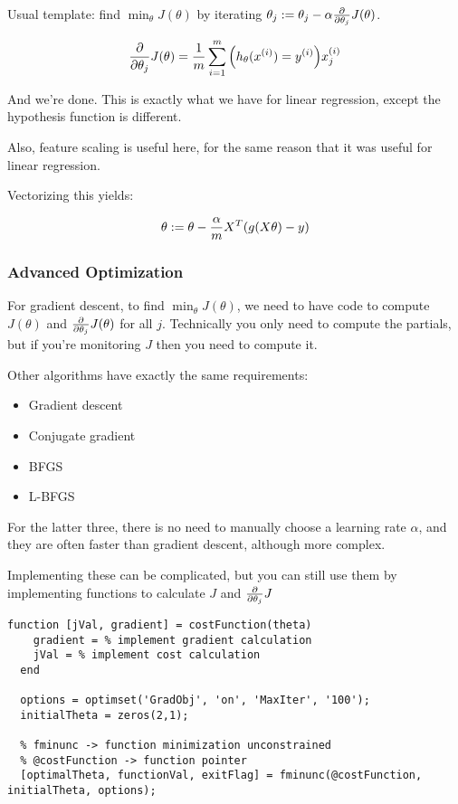 Usual template: find $\min_\theta J(\theta)$ 
by iterating  $\theta_j := \theta_j - \alpha \pdv{\theta_j} J(\theta)$.

\[ \pdv{\theta_j}J(\theta) = \frac{1}{m} \sum_{i=1}^m \qty(h_\theta(x_{}^{(i)}) = y_{}^{(i)}) x_{j}^{(i)} \]

And we're done.
This is exactly what we have for linear regression,
except the hypothesis function is different.

Also, feature scaling is useful here, for the same reason that it was useful for linear regression.

Vectorizing this yields:

\[ \theta := \theta - \frac{\alpha}{m} X^T \qty( g(X\theta) - y ) \]

\subsubsection{Advanced Optimization}

For gradient descent, to find $\min_\theta J(\theta)$, 
we need to have code to compute $J(\theta)$ 
and $\pdv{\theta_j}J(\theta)$ for all $j$.
Technically you only need to compute the partials,
but if you're monitoring $J$ then you need to compute it.

Other algorithms have exactly the same requirements:

\begin{itemize}
  \item Gradient descent
  \item Conjugate gradient
  \item BFGS
  \item L-BFGS
\end{itemize}

For the latter three, there is no need to manually choose a learning rate $\alpha$, 
and they are often faster than gradient descent, although more complex.

Implementing these can be complicated, but you can still use them by 
implementing functions to calculate $J$ and $\pdv{\theta_j} J$

\begin{lstlisting}[style=Matlab-editor]
  function [jVal, gradient] = costFunction(theta)
    gradient = % implement gradient calculation
    jVal = % implement cost calculation
  end

  options = optimset('GradObj', 'on', 'MaxIter', '100');
  initialTheta = zeros(2,1);

  % fminunc -> function minimization unconstrained
  % @costFunction -> function pointer
  [optimalTheta, functionVal, exitFlag] = fminunc(@costFunction, initialTheta, options);
\end{lstlisting}

